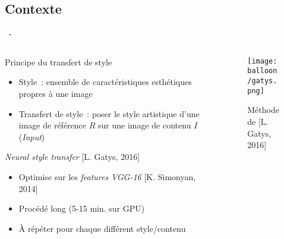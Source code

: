 \documentclass[aspectratio=169, 22pt]{beamer}
\begin{document}
\subsection{Contexte}
\begin{frame}{\secname~- \subsecname}
  \begin{columns}
    \begin{column}{0.6\linewidth}
      \begin{customblock}{Principe du transfert de style}
        \begin{itemize}
        \item \small Style : ensemble de \alert{caractéristiques esthétiques} propres à une image
        \item \small Transfert de style : poser le style artistique d'une
          image de \alert{référence} $R$ sur une image de \alert{contenu} $I$ (\emph{Input})
        \end{itemize}    
      \end{customblock}
      \begin{block}{\emph{Neural style transfer} [L. Gatys, 2016]}
        \begin{itemize}
        \item \small Optimise sur les \emph{features} \emph{VGG-16} [K. Simonyan, 2014]
        \item \small Procédé \alert{long} (5-15 min. sur GPU)
        \item \small À répéter pour chaque différent style/contenu
        \end{itemize}
      \end{block}
    \end{column}
    \begin{column}{0.4\linewidth}
      \begin{figure}
        \centering
        \texttt{[image: balloon/gatys.png]}
        \caption{Méthode de [L. Gatys, 2016]}
      \end{figure}
    \end{column}
  \end{columns}
\end{frame}
\end{document}
